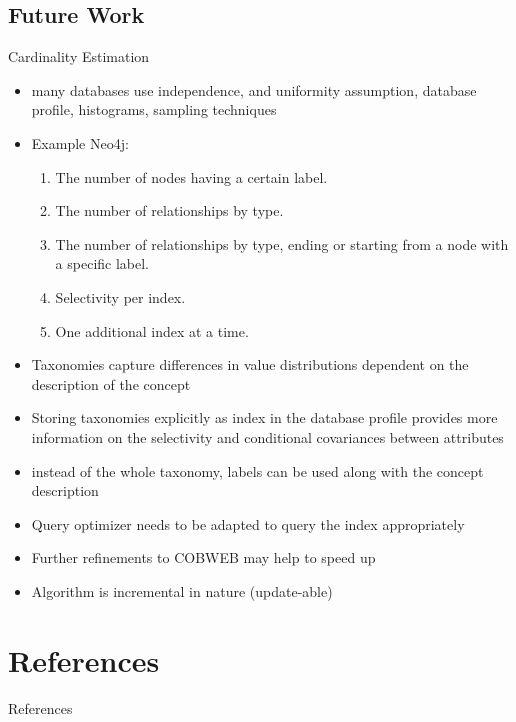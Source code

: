 \documentclass[rgb]{beamer}
\begin{document}
    \subsection{Future Work}
    \begin{frame}[allowframebreaks]{Cardinality Estimation}
        \begin{itemize}
            \item many databases use independence, and uniformity assumption, database profile, histograms, sampling techniques
            \item Example Neo4j: 
            \begin{enumerate}
                \item The number of nodes having a certain label.
                \item The number of relationships by type.
                \item  The number of relationships by type, ending or starting from a node with a specific label.
                \item Selectivity per index.
                \item One additional index at a time.
            \end{enumerate}
            \item Taxonomies capture differences in value distributions dependent on the description of the concept
            \item Storing taxonomies explicitly as index in the database profile provides more information on the selectivity and conditional covariances between attributes
            \item instead of the whole taxonomy, labels can be used along with the concept description
            \item Query optimizer needs to be adapted to query the index appropriately
            \item Further refinements to COBWEB may help to speed up
            \item Algorithm is incremental in nature (update-able)
        \end{itemize}
    \end{frame}

\section{References}
    \begin{frame}[allowframebreaks]{References}
      \begin{tiny}
      \printbibliography
      \end{tiny}
    \end{frame}
    
\end{document}
